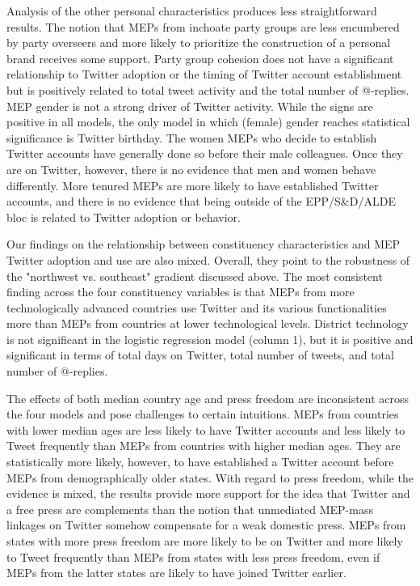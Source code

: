 \documentclass[12pt]{article}\usepackage[]{graphicx}\usepackage[]{color}
\begin{document}
	Analysis of the other personal characteristics produces less straightforward results.  The notion that MEPs from inchoate party groups are less encumbered by party overseers and more likely to prioritize the construction of a personal brand  receives some support. Party group cohesion does not have a significant relationship to Twitter adoption or the timing of Twitter account establishment but is positively related to total tweet activity and the total number of @-replies. MEP gender is not a strong driver of Twitter activity. While the signs are positive in all models, the only model in which (female) gender reaches statistical significance is Twitter birthday.  The women MEPs who decide to establish Twitter accounts have generally done so before their male colleagues.  Once they are on Twitter, however, there is no evidence that men and women behave differently. More tenured MEPs are more likely to have established Twitter accounts, and there is no evidence that being outside of the EPP/S\&D/ALDE bloc is related to Twitter adoption or behavior.

	Our findings on the relationship between constituency characteristics and MEP Twitter adoption and use are also mixed. Overall, they point to the robustness of the "northwest vs. southeast" gradient discussed above. The most consistent finding across the four constituency variables is that MEPs from more technologically advanced countries use Twitter and its various functionalities more than MEPs from countries at lower technological levels. District technology is not significant in the logistic regression model (column 1), but it is positive and significant in terms of total days on Twitter, total number of tweets, and total number of @-replies. 
  
  The effects of both median country age and press freedom are inconsistent across the four models and pose challenges to certain intuitions. MEPs from countries with lower median ages are less likely to have Twitter accounts and less likely to Tweet frequently than MEPs from countries with higher median ages. They are statistically more likely, however, to have established a Twitter account before MEPs from demographically older states. With regard to press freedom, while the evidence is mixed, the results provide more support for the idea that Twitter and a free press are complements than the notion that unmediated MEP-mass linkages on Twitter somehow compensate for a weak domestic press. MEPs from states with more press freedom are more likely to be on Twitter and more likely to Tweet frequently than MEPs from states with less press freedom, even if MEPs from the latter states are likely to have joined Twitter earlier.
   
\end{document}
